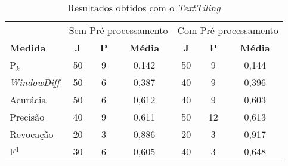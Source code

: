 \documentclass{article}
\begin{document}
\begin{table}[!h]
	\centering
	\begin{tabular}{|l||c|c|c||c|c|c|} \hline

		& \multicolumn{3}{c||}{Sem Pré-processamento} 
		& \multicolumn{3}{c|}{Com Pré-processamento}\\			

		\textbf{Medida} & 
		\textbf{J} &
		\textbf{P} & 
		\textbf{Média} &
		\textbf{J} &
		\textbf{P} & 
		\textbf{Média} \\	\hline

		P$_k$				& 50 & 9 & 0,142 & 50 & 9  & 0,144 \\ \hline
		\textit{WindowDiff}	& 50 & 6 & 0,387 & 40 & 9  & 0,396 \\ \hline
		Acurácia			& 50 & 6 & 0,612 & 40 & 9  & 0,603 \\ \hline
		Precisão			& 40 & 9 & 0,611 & 50 & 12 & 0,613 \\ \hline
		Revocação			& 20 & 3 & 0,886 & 20 & 3  & 0,917 \\ \hline
		F$^1$				& 30 & 6 & 0,605 & 40 & 3  & 0,648 \\ \hline

	\end{tabular}
	\caption{Resultados obtidos com o \textit{TextTiling}}
	\label{tab:resultadosTT}
\end{table}













 
 
\end{document}

